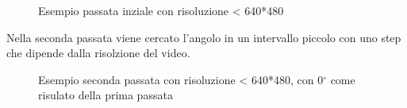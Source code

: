\documentclass[12pt]{article}
\begin{document}
\begin{figure}[h!]
	\begin{center}
	  \caption{Esempio passata inziale con risoluzione < 640*480}
	\end{center}
\end{figure}


\clearpage
Nella seconda passata viene cercato l'angolo in un intervallo piccolo con uno step
che dipende dalla risolzione del video.

\begin{figure}[h!]
	\begin{center}
	  \caption{Esempio seconda passata con risoluzione < 640*480, con 0$^{\circ}$ come risulato della prima passata}
	\end{center}
\end{figure}
\end{document}
